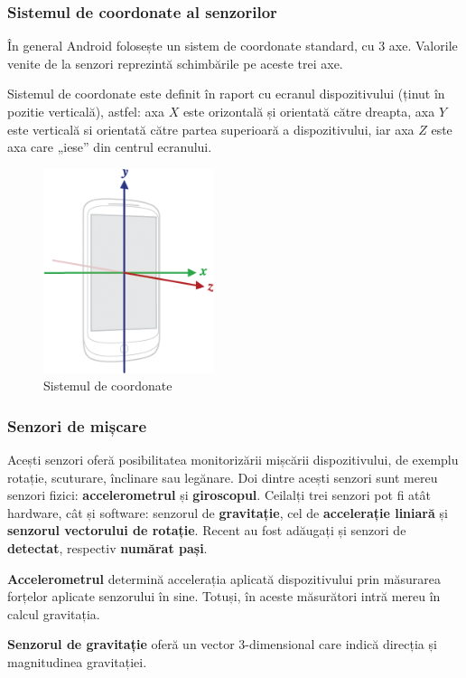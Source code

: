 \documentclass[12pt,a4paper]{article}
\begin{document}
\subsubsection{Sistemul de coordonate al senzorilor}
În general Android folosește un sistem de coordonate standard, cu 3 axe. Valorile venite de la senzori reprezintă schimbările pe aceste trei axe.

Sistemul de coordonate este definit în raport cu ecranul dispozitivului (ținut în pozitie verticală), astfel: axa $X$ este orizontală și orientată către dreapta, axa $Y$ este verticală si orientată către partea superioară a dispozitivului, iar axa $Z$ este axa care „iese” din centrul ecranului.

\begin{figure}[hbtp]
\centering
\includegraphics[width=5cm]{figures/axis_device.png}
\caption{Sistemul de coordonate}
\end{figure}


\subsubsection{Senzori de mișcare}
Acești senzori oferă posibilitatea monitorizării mișcării dispozitivului, de exemplu rotație, scuturare, înclinare sau legănare. Doi dintre acești senzori sunt mereu senzori fizici: \textbf{accelerometrul} și \textbf{giroscopul}. Ceilalți trei senzori pot fi atât hardware, cât și software: senzorul de \textbf{gravitație}, cel de \textbf{accelerație liniară} și \textbf{senzorul vectorului de rotație}. Recent au fost adăugați și senzori de \textbf{detectat}, respectiv \textbf{numărat pași}.

	\textbf{Accelerometrul} determină accelerația aplicată dispozitivului prin măsurarea forțelor aplicate senzorului în sine. Totuși, în aceste măsurători intră mereu în calcul gravitația.

	\textbf{Senzorul de gravitație} oferă un vector 3-dimensional care indică direcția și magnitudinea gravitației.
\end{document}
